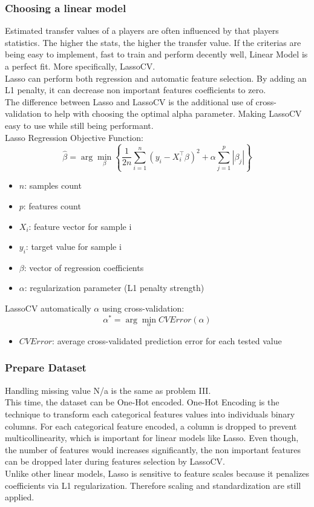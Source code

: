 \documentclass{report}
\begin{document}
\subsubsection{Choosing a linear model}
Estimated transfer values of a players are often influenced by that players statistics. The higher
the stats, the higher the transfer value. If the criterias are being easy to implement, fast to train 
and perform decently well, Linear Model is a perfect fit. More specifically, LassoCV. \\
Lasso can perform both regression and automatic feature selection. By adding an L1 penalty, 
it can decrease non important features coefficients to zero. \\
The difference between Lasso and LassoCV is the additional use of cross-validation to help with 
choosing the optimal alpha parameter. Making LassoCV easy to use while still being performant. \\

Lasso Regression Objective Function:
\[  %
    \hat{\beta} = \arg\min_{\beta} \left\{ \frac{1}{2n} \sum_{i=1}^{n} 
    (y_i - X_i^{\top} \beta)^2 + \alpha \sum_{j=1}^{p} |\beta_j| \right\}
\]
\begin{itemize}
    \item \( n \): samples count
    \item \( p \): features count
    \item \( X_i \): feature vector for sample i
    \item \( y_i \): target value for sample i
    \item \( \beta \): vector of regression coefficients
    \item \( \alpha \): regularization parameter (L1 penalty strength)
\end{itemize}

LassoCV automatically $\alpha$ using cross-validation:
\[ \alpha^* = \arg\min_{\alpha} CVError(\alpha) \]
\begin{itemize}
    \item \( CVError \): average cross-validated prediction error for each tested value
\end{itemize}

\subsubsection{Prepare Dataset}
Handling missing value N/a is the same as problem III. \\
This time, the dataset can be One-Hot encoded.
One-Hot Encoding is the technique to transform each categorical features values into individuals
binary columns. For each categorical feature encoded, a column is dropped to prevent multicollinearity,
which is important for linear models like Lasso. Even though, the number of features would increases 
significantly, the non important features can be dropped later during features selection by LassoCV. \\
Unlike other linear models, Lasso is sensitive to feature scales because it penalizes coefficients 
via L1 regularization. Therefore scaling and standardization are still applied.  
\end{document}
